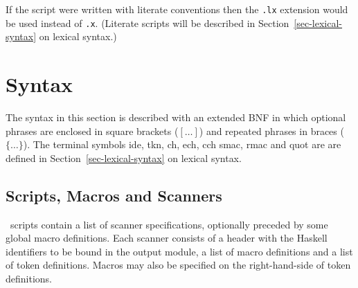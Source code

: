 If the script were written with literate conventions then the \mbox{\tt .lx} extension
would be used instead of \mbox{\tt .x}.  (Literate scripts will be described in
Section~\ref{sec-lexical-syntax} on lexical syntax.)


\section{Syntax}

The syntax in this section is described with an extended BNF in which optional
phrases are enclosed in square brackets ($[\dots]$) and repeated phrases in
braces ($\{\dots\}$).  The terminal symbols {\sf ide}, {\sf tkn}, {\sf ch},
{\sf ech}, {\sf cch} {\sf smac}, {\sf rmac} and {\sf quot} are are defined in
Section~\ref{sec-lexical-syntax} on lexical syntax.


\subsection{Scripts, Macros and Scanners}

\lx\ scripts contain a list of scanner specifications, optionally preceded by
some global macro definitions.  Each scanner consists of a header with the
Haskell identifiers to be bound in the output module, a list of macro
definitions and a list of token definitions.  Macros may also be specified on
the right-hand-side of token definitions.


